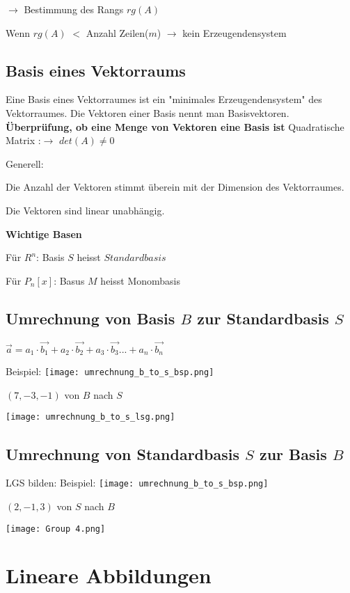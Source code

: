 \begin{multicols*}{3}
    {$\rightarrow$ Bestimmung des Rangs $rg(A)$}

    {Wenn $rg(A)$ $<$ Anzahl Zeilen($m$) $\rightarrow$ kein Erzeugendensystem}


    \subsection{Basis eines Vektorraums}
    {Eine Basis eines Vektorraumes ist ein "minimales Erzeugendensystem" des Vektorraumes. Die Vektoren einer Basis nennt man Basisvektoren.}
    {\textbf{Überprüfung, ob eine Menge von Vektoren eine Basis ist}}
    {Quadratische Matrix :$\rightarrow$ $det(A) \neq 0$}

    {Generell:}

    { Die Anzahl der Vektoren stimmt überein mit der Dimension des Vektorraumes.}

    { Die Vektoren sind linear unabhängig.}

    {\textbf{Wichtige Basen}}

    {Für $R^n$: Basis $S$ heisst $Standardbasis$ }

    {Für $P_n[x]$: Basus $M$ heisst Monombasis}
    \WhiteSpace

    \vfill\null
    \columnbreak
    \subsection{Umrechnung von Basis $B$ zur Standardbasis $S$}
    {$\vec{a} = a_1 \cdot \vec{b_1} + a_2 \cdot \vec{b_2} + a_3 \cdot \vec{b_3} ... + a_n \cdot \vec{b_n}$}

    {Beispiel:}
    {\texttt{[image: umrechnung\_b\_to\_s\_bsp.png]}}

    {$(7,-3,-1)$ von $B$ nach $S$}

    {\texttt{[image: umrechnung\_b\_to\_s\_lsg.png]}}

    \subsection{Umrechnung von Standardbasis $S$ zur Basis $B$}
    {LGS bilden:}
    {Beispiel:}
    {\texttt{[image: umrechnung\_b\_to\_s\_bsp.png]}}

    {$(2,-1,3)$ von $S$ nach $B$}

    {\texttt{[image: Group 4.png]}}
    \vfill\null
    \columnbreak
    \section{Lineare Abbildungen}

\end{multicols*}
